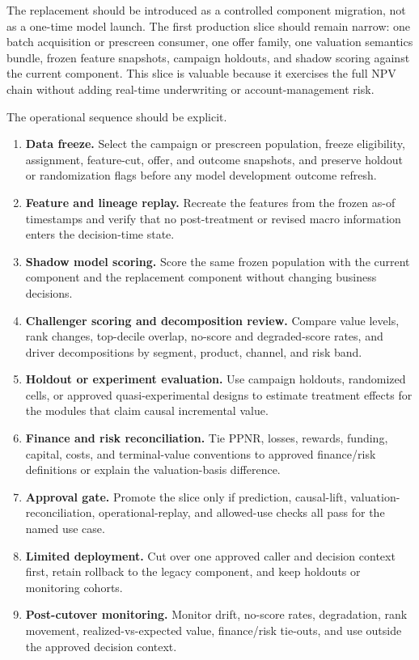 \documentclass[11pt]{article}
\newcommand{\1}{\mathbf{1}}
\begin{document}
The replacement should be introduced as a controlled component migration, not
as a one-time model launch. The first production slice should remain narrow:
one batch acquisition or prescreen consumer, one offer family, one valuation
semantics bundle, frozen feature snapshots, campaign holdouts, and shadow
scoring against the current component. This slice is valuable because it
exercises the full NPV chain without adding real-time underwriting or
account-management risk.

The operational sequence should be explicit.
\begin{enumerate}[label=\arabic*.]
  \item \textbf{Data freeze.} Select the campaign or prescreen population,
        freeze eligibility, assignment, feature-cut, offer, and outcome
        snapshots, and preserve holdout or randomization flags before any model
        development outcome refresh.
  \item \textbf{Feature and lineage replay.} Recreate the features from the
        frozen as-of timestamps and verify that no post-treatment or revised
        macro information enters the decision-time state.
  \item \textbf{Shadow model scoring.} Score the same frozen population with
        the current component and the replacement component without changing
        business decisions.
  \item \textbf{Challenger scoring and decomposition review.} Compare value
        levels, rank changes, top-decile overlap, no-score and degraded-score
        rates, and driver decompositions by segment, product, channel, and risk
        band.
  \item \textbf{Holdout or experiment evaluation.} Use campaign holdouts,
        randomized cells, or approved quasi-experimental designs to estimate
        treatment effects for the modules that claim causal incremental value.
  \item \textbf{Finance and risk reconciliation.} Tie PPNR, losses, rewards,
        funding, capital, costs, and terminal-value conventions to approved
        finance/risk definitions or explain the valuation-basis difference.
  \item \textbf{Approval gate.} Promote the slice only if prediction,
        causal-lift, valuation-reconciliation, operational-replay, and
        allowed-use checks all pass for the named use case.
  \item \textbf{Limited deployment.} Cut over one approved caller and decision
        context first, retain rollback to the legacy component, and keep
        holdouts or monitoring cohorts.
  \item \textbf{Post-cutover monitoring.} Monitor drift, no-score rates,
        degradation, rank movement, realized-vs-expected value, finance/risk
        tie-outs, and use outside the approved decision context.
\end{enumerate}
\end{document}
